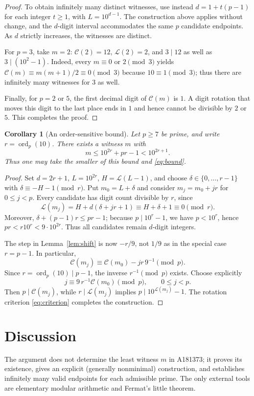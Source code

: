 \documentclass[10pt]{article}
\newtheorem{corollary}{Corollary}
\newcommand{\ord}{\operatorname{ord}}
\newcommand{\Cham}{\mathcal{C}}
\newcommand{\len}{\mathcal{L}}
\begin{document}
\begin{proof}
To obtain infinitely many distinct witnesses, use instead
$d=1+t(p-1)$ for each integer $t\ge1$, with $L=10^{d-1}$.
The construction above applies without change, and the $d$-digit
interval accommodates the same $p$ candidate endpoints.
As $d$ strictly increases, the witnesses are distinct.

For $p=3$, take $m=2$: $\Cham(2)=12$, $\len(2)=2$,
and $3\mid12$ as well as $3\mid(10^2-1)$.
Indeed, every $m\equiv0$ or $2\pmod3$ yields
$\Cham(m)\equiv m(m+1)/2\equiv0\pmod3$ because $10\equiv1\pmod3$;
thus there are infinitely many witnesses for $3$ as well.

Finally, for $p=2$ or $5$, the first decimal digit of $\Cham(m)$
is $1$. A digit rotation that moves this digit to the last place
ends in $1$ and hence cannot be divisible by $2$ or $5$.
This completes the proof.
\end{proof}

\begin{corollary}[An order-sensitive bound]\label{cor:order}
Let $p\ge7$ be prime, and write $r=\ord_p(10)$. There exists a
witness $m$ with
\[
  m\le10^{2r}+pr-1<10^{2r+1}.
\]
Thus one may take the smaller of this bound and \eqref{eq:bound}.
\end{corollary}
\begin{proof}
Set $d=2r+1$, $L=10^{2r}$, $H=\len(L-1)$, and choose
$\delta\in\{0,\ldots,r-1\}$ with $\delta\equiv-H-1\pmod r$.
Put $m_0=L+\delta$ and consider $m_j=m_0+jr$ for $0\le j<p$.
Every candidate has digit count divisible by $r$, since
\[
  \len(m_j)=H+d(\delta+jr+1)\equiv H+\delta+1\equiv0\pmod r.
\]
Moreover, $\delta+(p-1)r\le pr-1$; because $p\mid 10^r-1$,
we have $p<10^r$, hence $pr<r10^r<9\cdot10^{2r}$.
Thus all candidates remain $d$-digit integers.

The step in Lemma~\ref{lem:shift} is now $-r/9$, not
$1/9$ as in the special case $r=p-1$. In particular,
\[
  \Cham(m_j)\equiv\Cham(m_0)-jr\,9^{-1}\pmod p.
\]
Since $r=\ord_p(10)\mid p-1$, the inverse $r^{-1}\pmod p$
exists. Choose explicitly
\begin{equation}\label{eq:order-choice}
  \boxed{j\equiv 9\,r^{-1}\Cham(m_0)\pmod p,\qquad 0\le j<p.}
\end{equation}
Then $p\mid\Cham(m_j)$, while $r\mid\len(m_j)$ implies
$p\mid10^{\len(m_j)}-1$. The rotation criterion
\eqref{eq:criterion} completes the construction.
\end{proof}

\section{Discussion}
The argument does not determine the least witness $m$ in A181373;
it proves its existence, gives an explicit (generally nonminimal)
construction, and establishes infinitely many valid endpoints for
each admissible prime. The only external tools are elementary
modular arithmetic and Fermat's little theorem.
\end{document}
